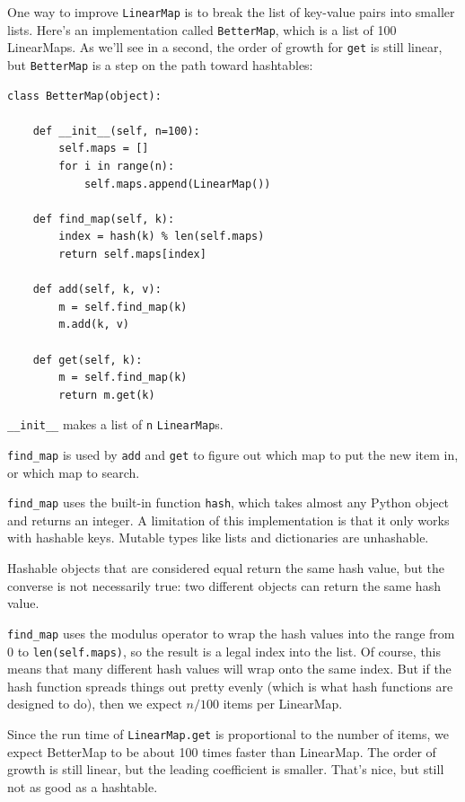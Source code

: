 \documentclass[10pt]{book}
\begin{document}
One way to improve {\tt LinearMap} is to break the list of key-value
pairs into smaller lists.  Here's an implementation called
{\tt BetterMap}, which is a list of 100 LinearMaps.  As we'll see
in a second, the order of growth for {\tt get} is still linear,
but {\tt BetterMap} is a step on the path toward hashtables:

\begin{verbatim}
class BetterMap(object):

    def __init__(self, n=100):
        self.maps = []
        for i in range(n):
            self.maps.append(LinearMap())

    def find_map(self, k):
        index = hash(k) % len(self.maps)
        return self.maps[index]

    def add(self, k, v):
        m = self.find_map(k)
        m.add(k, v)

    def get(self, k):
        m = self.find_map(k)
        return m.get(k)
\end{verbatim}

\verb"__init__" makes a list of {\tt n} {\tt LinearMap}s.

\verb"find_map" is used by
{\tt add} and {\tt get}
to figure out which map to put the
new item in, or which map to search.  

\verb"find_map" uses the built-in function {\tt hash}, which takes
almost any Python object and returns an integer.  A limitation of this
implementation is that it only works with hashable keys.  Mutable
types like lists and dictionaries are unhashable.

Hashable objects that are considered equal return the same hash value,
but the converse is not necessarily true: two different objects
can return the same hash value.

\verb"find_map" uses the modulus operator to wrap the hash values
into the range from 0 to {\tt len(self.maps)}, so the result is a legal
index into the list.  Of course, this means that many different
hash values will wrap onto the same index.  But if the hash function
spreads things out pretty evenly (which is what hash functions
are designed to do), then we expect $n/100$ items per LinearMap.

Since the run time of {\tt LinearMap.get} is proportional to the
number of items, we expect BetterMap to be about 100 times faster
than LinearMap.  The order of growth is still linear, but the
leading coefficient is smaller.  That's nice, but still not
as good as a hashtable.
\end{document}
